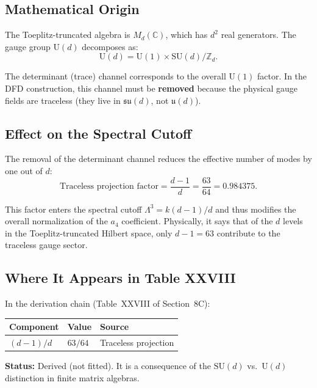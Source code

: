 \documentclass[12pt,a4paper]{article}
\begin{document}
\subsection{Mathematical Origin}

The Toeplitz-truncated algebra is $M_d(\mathbb{C})$, which has $d^2$ real
generators. The gauge group $\mathrm{U}(d)$ decomposes as:
\begin{equation}
\mathrm{U}(d) = \mathrm{U}(1) \times \mathrm{SU}(d) / \mathbb{Z}_d.
\end{equation}

The determinant (trace) channel corresponds to the overall $\mathrm{U}(1)$ factor.
In the DFD construction, this channel must be \textbf{removed} because the
physical gauge fields are traceless (they live in $\mathfrak{su}(d)$, not
$\mathfrak{u}(d)$).

\subsection{Effect on the Spectral Cutoff}

The removal of the determinant channel reduces the effective number of modes
by one out of $d$:
\begin{equation}
\boxed{\text{Traceless projection factor} = \frac{d-1}{d} = \frac{63}{64}
= 0.984375.}
\end{equation}

This factor enters the spectral cutoff $\Lambda^3 = k(d-1)/d$ and thus
modifies the overall normalization of the $a_4$ coefficient. Physically, it
says that of the $d$ levels in the Toeplitz-truncated Hilbert space, only
$d-1 = 63$ contribute to the traceless gauge sector.

\subsection{Where It Appears in Table XXVIII}

In the derivation chain (Table~XXVIII of Section~8C):
\begin{center}
\begin{tabular}{lll}
\toprule
Component & Value & Source \\
\midrule
$(d-1)/d$ & $63/64$ & Traceless projection \\
\bottomrule
\end{tabular}
\end{center}

\textbf{Status:} Derived (not fitted). It is a consequence of the
$\mathrm{SU}(d)$ vs.\ $\mathrm{U}(d)$ distinction in finite matrix algebras.
\end{document}
